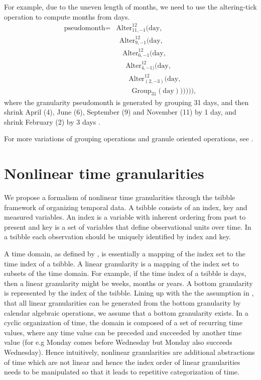 \documentclass[12pt]{article}
\begin{document}
For example, due to the uneven length of months, we need to use the altering-tick operation to compute months from days.
\begin{align*}
\text{pseudomonth} = &\text{Alter}^{12}_{11,-1}(\text{day}, \\
  &~~\text{Alter}^{12}_{9,-1}(\text{day}, \\
  &~~~~\text{Alter}^{12}_{6,-1}(\text{day}, \\
  &~~~~~~\text{Alter}^{12}_{4,-1)}(\text{day}, \\
  &~~~~~~~~\text{Alter}^{12}_{(2,-3)}(\text{day}, \\
  &~~~~~~~~~~\text{Group}_{31}(\text{day})))))),
\end{align*}
where the granularity pseudomonth is generated by grouping 31 days, and then shrink April (4), June (6), September (9) and November (11) by 1 day, and shrink February (2) by 3 days \citep{Ning2002-tf}.


For more variations of grouping operations and granule oriented operations, see \citet{Ning2002-tf}.

\hypertarget{sec:cyclic-gran}{%
\section{Nonlinear time granularities}\label{sec:cyclic-gran}}

We propose a formalism of nonlinear time granularities through the tsibble \citep{wang2019tsibble} framework of organizing temporal data. A tsibble consists of an index, key and measured variables. An index is a variable with inherent ordering from past to present and key is a set of variables that define observational units over time. In a tsibble each observation should be uniquely identified by index and key.

A time domain, as defined by \citet{Bettini1998-ed}, is essentially a mapping of the index set to the time index of a tsibble. A linear granularity is a mapping of the index set to subsets of the time domain. For example, if the time index of a tsibble is days, then a linear granularity might be weeks, months or years. A bottom granularity is represented by the index of the tsibble. Lining up with the the assumption in \citet{Bettini2000-vy}, that all linear granularities can be generated from the bottom granularity by calendar algebraic operations, we assume that a bottom granularity exists. In a cyclic organization of time, the domain is composed of a set of recurring time values, where any time value can be preceded and succeeded by another time value (for e.g Monday comes before Wednesday but Monday also succeeds Wednesday). Hence intuitively, nonlinear granularities are additional abstractions of time which are not linear and hence the index order of linear granularities needs to be manipulated so that it leads to repetitive categorization of time.
\end{document}
